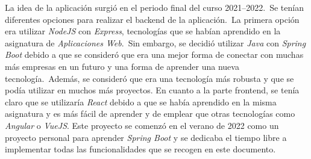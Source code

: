 La idea de la aplicación surgió en el periodo final del curso 2021--2022.\ Se tenían diferentes opciones para realizar
el backend de la aplicación.\ La primera opción era utilizar \textit{NodeJS} con \textit{Express},
tecnologías que se habían aprendido en la asignatura de \textit{Aplicaciones Web}.\ Sin embargo, se decidió utilizar
\textit{Java} con \textit{Spring Boot} debido a que se consideró que era una mejor forma de conectar con muchas más
empresas en un futuro y una forma de aprender una nueva tecnología.\ Además, se consideró que era una tecnología más
robusta y que se podía utilizar en muchos más proyectos.
En cuanto a la parte frontend, se tenía claro que se utilizaría \textit{React} debido a que se había aprendido en la
misma asignatura y es más fácil de aprender y de emplear que otras tecnologías como \textit{Angular} o \textit{VueJS}.
Este proyecto se comenzó en el verano de 2022 como un proyecto personal para aprender \textit{Spring Boot} y
se dedicaba el tiempo libre a implementar todas las funcionalidades que se recogen en este documento.
